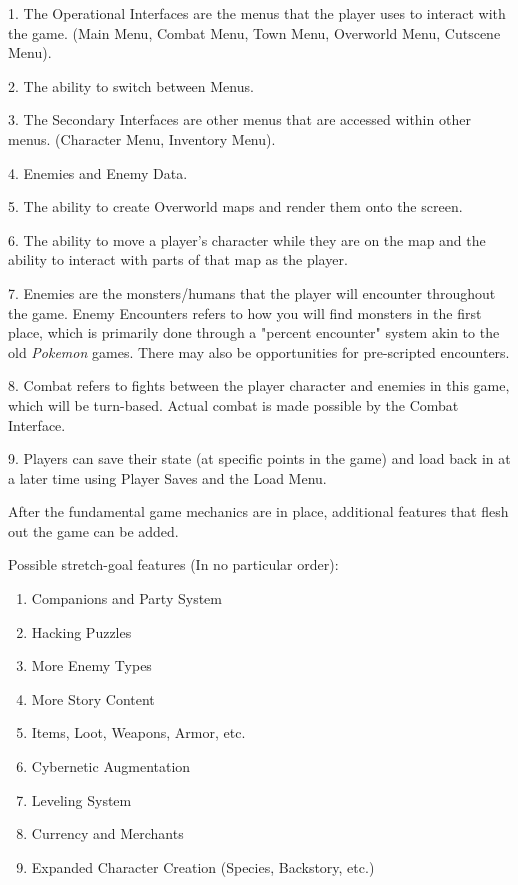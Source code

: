 \documentclass[10pt,conference,onecolumn,compsoc]{IEEEtran}
\begin{document}
\begin{flushleft}
1. The Operational Interfaces are the menus that the player uses to interact with the game. (Main Menu, Combat Menu, Town Menu, Overworld Menu, Cutscene Menu).

2. The ability to switch between Menus.

3. The Secondary Interfaces are other menus that are accessed within other menus. (Character Menu, Inventory Menu).

4. Enemies and Enemy Data.

5. The ability to create Overworld maps and render them onto the screen.

6. The ability to move a player's character while they are on the map and the ability to interact with parts of that map as the player.

7. Enemies are the monsters/humans that the player will encounter throughout the game. Enemy Encounters refers to how you will find monsters in the first place, which is primarily done through a "percent encounter" system akin to the old \textit{Pokemon} games. There may also be opportunities for pre-scripted encounters.

8. Combat refers to fights between the player character and enemies in this game, which will be turn-based. Actual combat is made possible by the Combat Interface.

9. Players can save their state (at specific points in the game) and load back in at a later time using Player Saves and the Load Menu.
\end{flushleft}

After the fundamental game mechanics are in place, additional features that flesh out the game can be added.

Possible stretch-goal features (In no particular order):
\begin{enumerate}
\item Companions and Party System
\item Hacking Puzzles
\item More Enemy Types
\item More Story Content
\item Items, Loot, Weapons, Armor, etc.
\item Cybernetic Augmentation
\item Leveling System
\item Currency and Merchants
\item Expanded Character Creation (Species, Backstory, etc.)
\end{enumerate}
\end{document}
